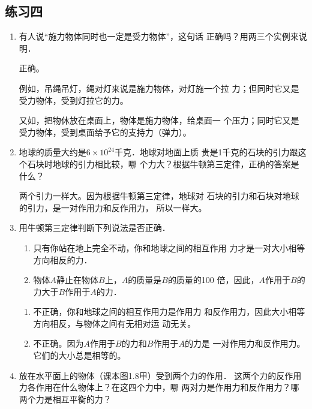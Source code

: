 \subsection{练习四}
\begin{enumerate}
\item  有人说“施力物体同时也一定是受力物体”，这句话
正确吗？用两三个实例来说明．

\begin{solution}
    正确。

    例如，吊绳吊灯，绳对灯来说是施力物体，对灯施一个拉
    力；但同时它又是受力物体，受到灯拉它的力。

    又如，把物休放在桌面上，物体是施力物体，给桌面一
    个压力；同时它又是受力物体，受到桌面给予它的支持力（弹力）。
\end{solution}
\item  地球的质量大约是$6\times 10^{24}$千克．地球对地面上质
贵是1千克的石块的引力跟这个石块时地球的引力相比较，哪
个力大？根据牛顿第三定律，正确的答案是什么？

\begin{solution}
    两个引力一样大。因为根据牛顿第三定律，地球对
    石块的引力和石块对地球的引力，是一对作用力和反作用力，
    所以一样大。
\end{solution}

\item  用牛顿第三定律判断下列说法是否正确．
\begin{enumerate}
\item  只有你站在地上完全不动，你和地球之间的相互作用
力才是一对大小相等方向相反的力．
\item  物体$A$静止在物体$B$上，$A$的质量是$B$的质量的100
倍，因此，$A$作用于$B$的力大于$B$作用于$A$的力．
\end{enumerate}


\begin{solution}
\begin{enumerate}
    \item 不正确，你和地球之间的相互作用力是作用力
    和反作用力，因此大小相等方向相反，与物体之间有无相对运
    动无关。
    \item 不正确。因为$A$作用于$B$的力和$B$作用于$A$的力是
    一对作用力和反作用力。它们的大小总是相等的。
\end{enumerate}
\end{solution}
\item  放在水平面上的物体（课本图1.8甲）受到两个力的作用．
这两个力的反作用力各作用在什么物体上？在这四个力中，哪
两对力是作用力和反作用力？哪两个力是相互平衡的力？


\end{enumerate}

